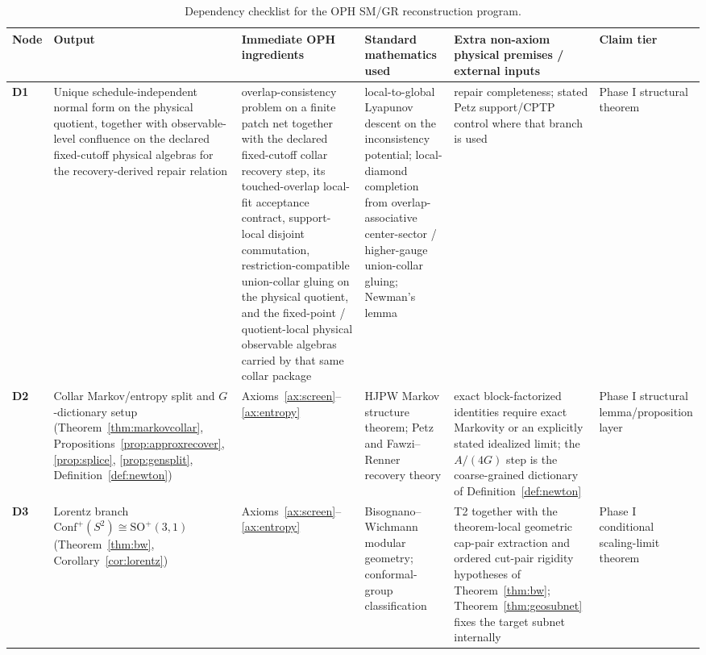 \documentclass[11pt]{article}
\newcommand{\Conf}{\mathrm{Conf}}
\begin{document}
\begingroup
\tiny
\setlength{\tabcolsep}{1pt}
\begin{longtable}{@{}>{\raggedright\arraybackslash}p{}>{\raggedright\arraybackslash}p{}>{\raggedright\arraybackslash}p{}>{\raggedright\arraybackslash}p{}>{\raggedright\arraybackslash}p{}>{\raggedright\arraybackslash}p{}@{}}
\caption{Dependency checklist for the OPH SM/GR reconstruction program.}\\
\toprule
Node & Output & Immediate OPH ingredients & Standard mathematics used & Extra non-axiom physical premises / external inputs & Claim tier \\
\midrule
\endhead
\bottomrule
\endfoot
\textbf{D1} & Unique schedule-independent normal form on the physical quotient, together with observable-level confluence on the declared fixed-cutoff physical algebras for the recovery-derived repair relation & overlap-consistency problem on a finite patch net together with the declared fixed-cutoff collar recovery step, its touched-overlap local-fit acceptance contract, support-local disjoint commutation, restriction-compatible union-collar gluing on the physical quotient, and the fixed-point / quotient-local physical observable algebras carried by that same collar package & local-to-global Lyapunov descent on the inconsistency potential; local-diamond completion from overlap-associative center-sector / higher-gauge union-collar gluing; Newman's lemma & repair completeness; stated Petz support/CPTP control where that branch is used & Phase I structural theorem \\
\textbf{D2} & Collar Markov/entropy split and \(G\)-dictionary setup (Theorem~\ref{thm:markovcollar}, Propositions~\ref{prop:approxrecover}, \ref{prop:splice}, \ref{prop:gensplit}, Definition~\ref{def:newton}) & Axioms~\ref{ax:screen}--\ref{ax:entropy} & HJPW Markov structure theorem; Petz and Fawzi--Renner recovery theory & exact block-factorized identities require exact Markovity or an explicitly stated idealized limit; the \(A/(4G)\) step is the coarse-grained dictionary of Definition~\ref{def:newton} & Phase I structural lemma/proposition layer \\
\textbf{D3} & Lorentz branch \(\Conf^+(S^2)\cong \mathrm{SO}^+(3,1)\) (Theorem~\ref{thm:bw}, Corollary~\ref{cor:lorentz}) & Axioms~\ref{ax:screen}--\ref{ax:entropy} & Bisognano--Wichmann modular geometry; conformal-group classification & T2 together with the theorem-local geometric cap-pair extraction and ordered cut-pair rigidity hypotheses of Theorem~\ref{thm:bw}; Theorem~\ref{thm:geosubnet} fixes the target subnet internally & Phase I conditional scaling-limit theorem \\

\end{longtable}
\end{document}
